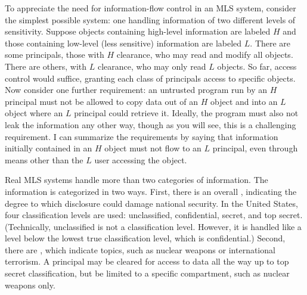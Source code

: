 To appreciate the need for information-flow control in an MLS system,
consider the simplest possible system: one handling information of two
different levels of sensitivity.  Suppose objects containing high-level
information are labeled $H$ and those containing low-level (less
sensitive) information are labeled $L$.  There are some principals, those
with $H$ clearance, who may read and modify all objects.  There are
others, with $L$ clearance, who may only read $L$ objects.  So far,
access control would suffice, granting each class of principals access to
specific objects.  Now consider one further requirement: an
untrusted program run by an $H$ principal must not be allowed to copy
data out of an $H$ object and into an $L$ object where an $L$
principal could retrieve it.  Ideally, the program must also not leak
the information any other way, though as you will see, this is a
challenging requirement. I can summarize the requirements by saying
that information initially contained in an $H$ object must not flow to
an $L$ principal, even through means other than the $L$ user accessing
the object.

Real MLS systems handle more than two categories of information.  The
information is categorized in two ways.  First, there is an overall
, indicating the degree to which disclosure could
damage national security.  In the United States, four classification levels are
used: unclassified, confidential, secret, and top secret.
(Technically, unclassified is not a classification level.  However, it
is handled like a level below the lowest true classification level, which is
confidential.) Second, there are , which indicate
topics, such as nuclear weapons or international terrorism.  A
principal may be cleared for access to data all the way up to top
secret classification, but be limited to a specific compartment, such as
nuclear weapons only.

